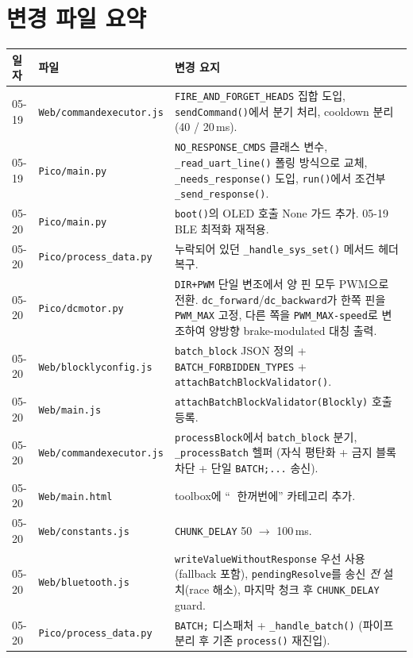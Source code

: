 \documentclass[11pt, oneside]{article}
\begin{document}
\section{변경 파일 요약}

\begin{table}[h]
\centering
\small
\begin{tabularx}{\linewidth}{@{}llX@{}}
\toprule
일자 & 파일 & 변경 요지 \\
\midrule
05-19 & \texttt{Web/commandexecutor.js} & \texttt{FIRE\_AND\_FORGET\_HEADS} 집합 도입, \texttt{sendCommand()}에서 분기 처리, cooldown 분리(40 / 20\,ms). \\
05-19 & \texttt{Pico/main.py} & \texttt{NO\_RESPONSE\_CMDS} 클래스 변수, \texttt{\_read\_uart\_line()} 폴링 방식으로 교체, \texttt{\_needs\_response()} 도입, \texttt{run()}에서 조건부 \texttt{\_send\_response()}. \\
\midrule
05-20 & \texttt{Pico/main.py} & \texttt{boot()}의 OLED 호출 None 가드 추가. 05-19 BLE 최적화 재적용. \\
05-20 & \texttt{Pico/process\_data.py} & 누락되어 있던 \texttt{\_handle\_sys\_set()} 메서드 헤더 복구. \\
05-20 & \texttt{Pico/dcmotor.py} & \texttt{DIR+PWM} 단일 변조에서 양 핀 모두 PWM으로 전환. \texttt{dc\_forward}/\texttt{dc\_backward}가 한쪽 핀을 \texttt{PWM\_MAX} 고정, 다른 쪽을 \texttt{PWM\_MAX-speed}로 변조하여 양방향 brake-modulated 대칭 출력. \\
\midrule
05-20 & \texttt{Web/blocklyconfig.js} & \texttt{batch\_block} JSON 정의 + \texttt{BATCH\_FORBIDDEN\_TYPES} + \texttt{attachBatchBlockValidator()}. \\
05-20 & \texttt{Web/main.js} & \texttt{attachBatchBlockValidator(Blockly)} 호출 등록. \\
05-20 & \texttt{Web/commandexecutor.js} & \texttt{processBlock}에서 \texttt{batch\_block} 분기, \texttt{\_processBatch} 헬퍼 (자식 평탄화 + 금지 블록 차단 + 단일 \texttt{BATCH;...} 송신). \\
05-20 & \texttt{Web/main.html} & toolbox에 ``🚀 한꺼번에'' 카테고리 추가. \\
05-20 & \texttt{Web/constants.js} & \texttt{CHUNK\_DELAY} 50 $\rightarrow$ 100\,ms. \\
05-20 & \texttt{Web/bluetooth.js} & \texttt{writeValueWithoutResponse} 우선 사용(fallback 포함), \texttt{pendingResolve}를 송신 \emph{전} 설치(race 해소), 마지막 청크 후 \texttt{CHUNK\_DELAY} guard. \\
05-20 & \texttt{Pico/process\_data.py} & \texttt{BATCH;} 디스패처 + \texttt{\_handle\_batch()} (파이프 분리 후 기존 \texttt{process()} 재진입). \\

\end{tabularx}
\end{table}
\end{document}
